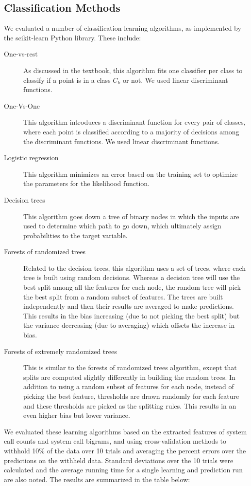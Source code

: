 \documentclass[11pt]{amsart}
\begin{document}
\subsection{Classification Methods}
We evaluated a number of classification learning algorithms, as implemented by the scikit-learn Python library. These include:
\begin{description}
  \item[One-vs-rest] As discussed in the textbook, this algorithm fits one classifier per class to classify if a point is in a class $C_k$ or not. We used linear discriminant functions.
  \item[One-Vs-One] This algorithm introduces a discriminant function for every pair of classes, where each point is classified according to a majority of decisions among the discriminant functions. We used linear discriminant functions.
  \item[Logistic regression] This algorithm minimizes an error based on the training set to optimize the parameters for the likelihood function.
  \item[Decision trees] This algorithm goes down a tree of binary nodes in which the inputs are used to determine which path to go down, which ultimately assign probabilities to the target variable.
  \item[Forests of randomized trees] Related to the decision trees, this algorithm uses a set of trees, where each tree is built using random decisions. Whereas a decision tree will use the best split among all the features for each node, the random tree will pick the best split from a random subset of features. The trees are built independently and then their results are averaged to make predictions. This results in the bias increasing (due to not picking the best split) but the variance decreasing (due to averaging) which offsets the increase in bias.
  \item[Forests of extremely randomized trees] This is similar to the forests of randomized trees algorithm, except that splits are computed slightly differently in building the random trees. In addition to using a random subset of features for each node, instead of picking the best feature, thresholds are drawn randomly for each feature and these thresholds are picked as the splitting rules. This results in an even higher bias but lower variance.
\end{description}

We evaluated these learning algorithms based on the extracted features of system call counts and system call bigrams, and using cross-validation methods to withhold 10\% of the data over 10 trials and averaging the percent errors over the predictions on the withheld data. Standard deviations over the 10 trials were calculated and the average running time for a single learning and prediction run are also noted. The results are summarized in the table below:\\
\end{document}
